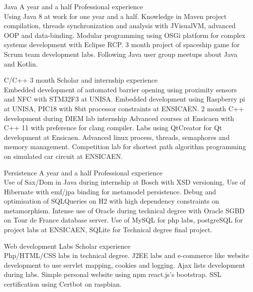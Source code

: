 \documentclass{tccv-master/tccv}
\begin{document}
\begin{eventlist}

\item
{Java}
{A year and a half}
{Professional experience}\\
Using Java 8 at work for one year and a half.
Knowledge in Maven project compilation, threads synchronization and analysis with JVisualVM, advanced OOP and data-binding.
Modular programming using OSGi platform for complex systems development with Eclipse RCP.
3 month project of spaceship game for Scrum team development labs.
Following Java user group meetups about Java and Kotlin. 

\item
{C/C++}
{3 month}
{Scholar and internship experience}\\
Embedded development of automated barrier opening using proximity sensors and NFC with STM32F3 at UNISA.
Embedded development using Raspberry pi at UNISA, PIC18 with 8bit processor constraints at ENSICAEN.
2 month C++ development during DIEM lab internship 
Advanced courses at Ensicaen with C++ 11 with preference for clang compiler.
Labs using QtCreator for Qt development at Ensicaen.
Advanced linux process, threads, semaphores and memory management.
Competition lab for shortest path algorithm programming on simulated car circuit at ENSICAEN.


\item
{Persistence}
{A year and a half}
{Professional experience}\\
Use of Sax/Dom in Java during internship at Bosch with XSD versioning.
Use of Hibernate with emf/jpa binding for metamodel persistence. 
Debug and optimisation of SQLQueries on H2 with high dependency constraints on metamorphism.
Intense use of Oracle during technical degree with Oracle SGBD on Tour de France database server.
Use of MySQL for php labs, postgreSQL for project labs at ENSICAEN, SQLite for Technical degree final project.

\item{Web development}
{Labs}
{Scholar experience}\\
Php/HTML/CSS labs in technical degree.
J2EE labs and e-commerce like website development to use servlet mapping, cookies and logging.
Ajax lists development during labs.
Simple personal website using npm react.js's bootstrap.
SSL certification using Certbot on raspbian.


\end{eventlist}
\end{document}
